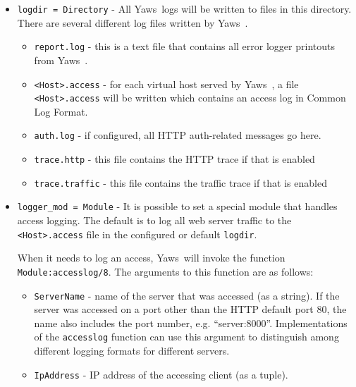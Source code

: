 \documentclass[11pt,oneside,english]{book}
\newcommand{\Yaws}            %
        {{\sc Yaws}}
\begin{document}
\begin{itemize}


\item       \verb+logdir = Directory+ -
              All \Yaws\  logs will be  written  to  files  in  this
              directory.  There  are  several different log files
              written by \Yaws\ .

              \begin{itemize}
              \item \verb+report.log+ - this is a text file that contains  all
              error logger printouts from \Yaws\ .
              \item \verb+<Host>.access+ - for each virtual host served by \Yaws\ ,
              a file \verb+<Host>.access+ will be written  which  contains
              an access log in Common Log Format.
              \item \verb+auth.log+ - if configured, all HTTP
              auth-related messages go here.
              \item \verb+trace.http+  -  this file contains the HTTP trace if
              that is enabled
              \item \verb+trace.traffic+ -  this  file  contains  the  traffic
              trace if that is enabled
              \end{itemize}

\item       \verb+logger_mod = Module+ -
              It is possible to set a special module that handles
              access logging. The default is to log all web server
              traffic to the \verb+<Host>.access+ file in the
              configured or default \verb+logdir+.

              When it needs to log an access, \Yaws\ will invoke the
              function \verb+Module:accesslog/8+. The arguments to
              this function are as follows:

\begin{itemize}
\item \verb+ServerName+ - name of the server that was accessed (as a
  string). If the server was accessed on a port other than the HTTP
  default port 80, the name also includes the port number,
  e.g. ``server:8000''. Implementations of the \verb+accesslog+
  function can use this argument to distinguish among different
  logging formats for different servers.

\item \verb+IpAddress+ - IP address of the accessing client (as a
  tuple).


\end{itemize}
\end{itemize}
\end{document}
